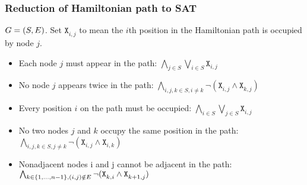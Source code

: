 \documentclass{beamer}
\DeclarePairedDelimiter{\set}{\{}{\}}
\DeclarePairedDelimiter{\tuple}{(}{)}
\newcommand{\satvar}[2]{\mathtt{X}_{#1}^{#2}}
\begin{document}
\begin{frame}
    \frametitle{Reduction of Hamiltonian path to SAT}
    $G=\tuple{S,E}$. Set $\satvar{i,j}{}$ to mean
    the $i$th position in the Hamiltonian path is
    occupied by node $j$.
    \begin{itemize}
        \item Each node $j$ must appear in the path:
        $\bigwedge_{j \in S} \bigvee_{i \in S} \satvar{i,j}{}$
        \item No node $j$ appears twice in the path:
        $\bigwedge_{i,j,k \in S, i \neq k} \neg (\satvar{i,j}{} \wedge \satvar{k,j}{})$
        \item Every position $i$ on the path must be occupied:
        $\bigwedge_{i \in S} \bigvee_{j \in S} \satvar{i,j}{}$
        \item No two nodes $j$ and $k$ occupy the same position in the path:
        $\bigwedge_{i,j,k \in S, j \neq k} \neg (\satvar{i,j}{} \wedge \satvar{i,k}{})$
        \item Nonadjacent nodes i and j cannot be adjacent in the path:
        $\bigwedge_{k \in \set{1,...,n-1}, (i,j) \notin E} \neg (\satvar{k,i}{} \wedge \satvar{k+1,j}{})$
    \end{itemize}
\end{frame}
\end{document}
